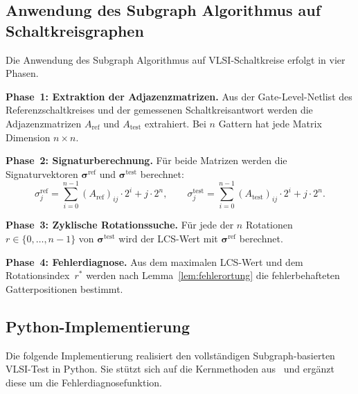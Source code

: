 ﻿\documentclass[a4paper,12pt]{article}
\theoremstyle{definition}
\begin{document}
\subsection{Anwendung des Subgraph Algorithmus auf Schaltkreisgraphen}

Die Anwendung des Subgraph Algorithmus auf VLSI-Schaltkreise erfolgt
in vier Phasen.

\textbf{Phase~1: Extraktion der Adjazenzmatrizen.}
Aus der Gate-Level-Netlist des Referenzschaltkreises und der gemessenen
Schaltkreisantwort werden die Adjazenzmatrizen $A_{\mathrm{ref}}$ und
$A_{\mathrm{test}}$ extrahiert. Bei $n$ Gattern hat jede Matrix Dimension
$n \times n$.

\textbf{Phase~2: Signaturberechnung.}
Für beide Matrizen werden die Signaturvektoren
$\boldsymbol{\sigma}^{\mathrm{ref}}$ und
$\boldsymbol{\sigma}^{\mathrm{test}}$ berechnet:
\[
  \sigma_j^{\mathrm{ref}}
  = \sum_{i=0}^{n-1} (A_{\mathrm{ref}})_{ij} \cdot 2^i + j \cdot 2^n,
  \qquad
  \sigma_j^{\mathrm{test}}
  = \sum_{i=0}^{n-1} (A_{\mathrm{test}})_{ij} \cdot 2^i + j \cdot 2^n.
\]

\textbf{Phase~3: Zyklische Rotationssuche.}
Für jede der $n$ Rotationen $r \in \{0, \ldots, n-1\}$ von
$\boldsymbol{\sigma}^{\mathrm{test}}$ wird der LCS-Wert mit
$\boldsymbol{\sigma}^{\mathrm{ref}}$ berechnet.

\textbf{Phase~4: Fehlerdiagnose.}
Aus dem maximalen LCS-Wert und dem Rotationsindex~$r^*$ werden nach
Lemma~\ref{lem:fehlerortung} die fehler\-behafteten Gatter\-positionen
bestimmt.

\subsection{Python-Implementierung}

Die folgende Implementierung realisiert den vollständigen
Subgraph-basierten VLSI-Test in Python. Sie stützt sich auf die
Kernmethoden aus~\cite{epp2026subgraph} und ergänzt diese um die
Fehlerdiagnosefunktion.
\end{document}
